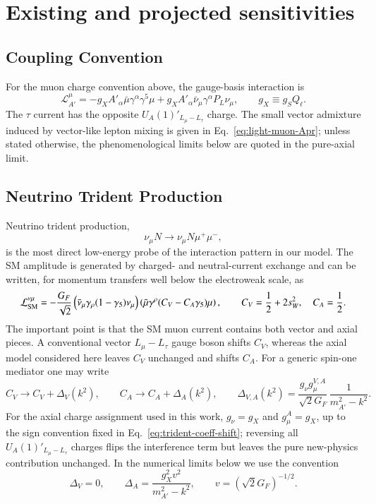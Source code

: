 \documentclass[onecolumn, aps, nofootinbib, prd, preprint, floats, floatfix, amsmath, amssymb, superscriptaddress, preprintnumbers]{revtex4-1}
\begin{document}
\section{Existing and projected sensitivities}
\label{sec:phenomenology}
\subsection{Coupling Convention}
For the muon charge convention above, the gauge-basis interaction is
\begin{equation}
\mathcal{L}_{A'}^\mu
=-g_XA'_\alpha\bar\mu\gamma^\alpha\gamma^5\mu
+g_XA'_\alpha\bar\nu_\mu\gamma^\alpha P_L\nu_\mu ,
\qquad g_X\equiv g_SQ_\ell .
\label{eq:phenomenology-coupling-convention}
\end{equation}
The \(\tau\) current has the opposite \(U_A(1)'_{L_\mu-L_\tau}\) charge. The small vector admixture induced by vector-like lepton mixing is given in Eq.~\eqref{eq:light-muon-Apr}; unless stated otherwise, the phenomenological limits below are quoted in the pure-axial limit.

\subsection{Neutrino Trident Production}
\label{subsec:trident}

Neutrino trident production,
\begin{equation}
\nu_\mu N\to \nu_\mu N\mu^+\mu^- ,
\end{equation}
is the most direct low-energy probe of the interaction pattern in our model. The SM amplitude is generated by charged- and neutral-current exchange and can be written, for momentum transfers well below the electroweak scale, as
\begin{equation}
\mathcal{L}_{\rm SM}^{\nu\mu}
=-\frac{G_F}{\sqrt2}
\left(\bar\nu_\mu\gamma_\rho(1-\gamma_5)\nu_\mu\right)
\left(\bar\mu\gamma^\rho(C_V-C_A\gamma_5)\mu\right),
\qquad
C_V=\frac12+2s_W^2,\quad C_A=\frac12 .
\label{eq:trident-sm-eff}
\end{equation}
The important point is that the SM muon current contains both vector and axial pieces. A conventional vector \(L_\mu-L_\tau\) gauge boson shifts \(C_V\), whereas the axial model considered here leaves \(C_V\) unchanged and shifts \(C_A\). For a generic spin-one mediator one may write
\begin{equation}
C_V\to C_V+\Delta_V(k^2),\qquad
C_A\to C_A+\Delta_A(k^2),\qquad
\Delta_{V,A}(k^2)=\frac{g_{\nu}g_{\mu}^{V,A}}{\sqrt2G_F}\,
\frac{1}{m_{A'}^2-k^2}.
\label{eq:trident-coeff-shift}
\end{equation}
For the axial charge assignment used in this work, \(g_\nu=g_X\) and \(g_\mu^A=g_X\), up to the sign convention fixed in Eq.~\eqref{eq:trident-coeff-shift}; reversing all \(U_A(1)'_{L_\mu-L_\tau}\) charges flips the interference term but leaves the pure new-physics contribution unchanged. In the numerical limits below we use the convention
\begin{equation}
\Delta_V=0,\qquad
\Delta_A=\frac{g_X^2v^2}{m_{A'}^2-k^2},
\qquad
v=(\sqrt2G_F)^{-1/2}.
\label{eq:trident-axial-shift}
\end{equation}
\end{document}

